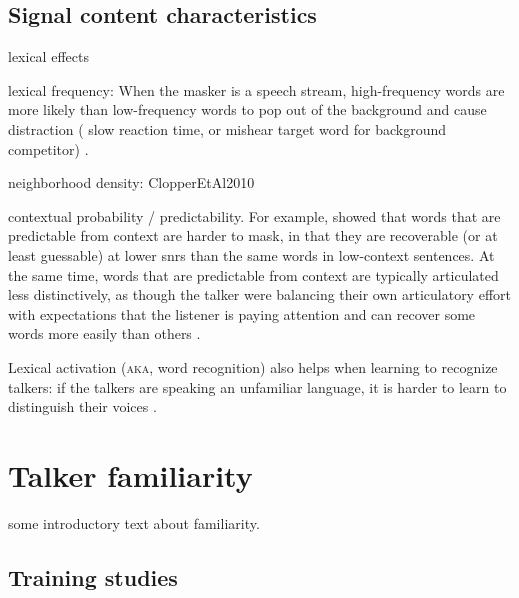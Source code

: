 \subsection{Signal content characteristics}
\begin{itm}
	\item{lexical effects \citep{HoenEtAl2007, BoulengerEtAl2010, BrouwerEtAl2012}}
	\item{lexical frequency: When the masker is a speech stream, high-frequency words are more likely than low-frequency words to pop out of the background and cause distraction (\ie{} slow reaction time, or mishear target word for background competitor) \citep{BoulengerEtAl2010}.}
	\item{neighborhood density: ClopperEtAl2010}
	\item{contextual probability / predictability.  For example, \citet{LewisEtAl1988} showed that words that are predictable from context are harder to mask, in that they are recoverable (or at least guessable) at lower \ac{snr}s than the same words in low-context sentences.  At the same time, words that are predictable from context are typically articulated less distinctively, as though the talker were balancing their own articulatory effort with expectations that the listener is paying attention and can recover some words more easily than others \citep{Wright2004a}.  }
	\item{Lexical activation (\textsc{aka}, word recognition) also helps when learning to recognize talkers: if the talkers are speaking an unfamiliar language, it is harder to learn to distinguish their voices \citep{PerrachioneWong2007}.}
\end{itm}




\section{Talker familiarity\label{sec:Fam}}
some introductory text about familiarity.

\subsection{Training studies\label{sec:Training}}

